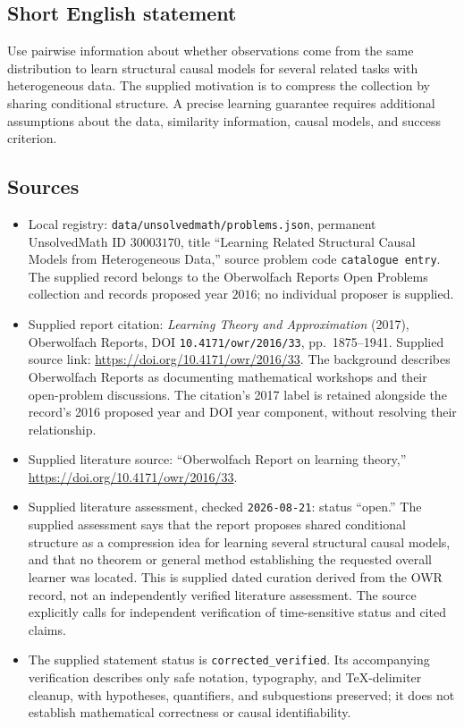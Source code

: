 \documentclass[11pt]{article}
\begin{document}
\subsection{Short English statement}
Use pairwise information about whether observations come from the same distribution to learn structural causal models for several related tasks with heterogeneous data. The supplied motivation is to compress the collection by sharing conditional structure. A precise learning guarantee requires additional assumptions about the data, similarity information, causal models, and success criterion.
\subsection{Sources}
\begin{itemize}
\item Local registry: \texttt{data/unsolvedmath/problems.json}, permanent UnsolvedMath ID \(30003170\), title ``Learning Related Structural Causal Models from Heterogeneous Data,'' source problem code \texttt{catalogue entry}. The supplied record belongs to the Oberwolfach Reports Open Problems collection and records proposed year \(2016\); no individual proposer is supplied.
\item Supplied report citation: \emph{Learning Theory and Approximation} (2017), Oberwolfach Reports, DOI \texttt{10.4171/owr/2016/33}, pp.\ 1875--1941. Supplied source link: \url{https://doi.org/10.4171/owr/2016/33}. The background describes Oberwolfach Reports as documenting mathematical workshops and their open-problem discussions. The citation's 2017 label is retained alongside the record's 2016 proposed year and DOI year component, without resolving their relationship.
\item Supplied literature source: ``Oberwolfach Report on learning theory,'' \url{https://doi.org/10.4171/owr/2016/33}.
\item Supplied literature assessment, checked \texttt{2026-08-21}: status ``open.'' The supplied assessment says that the report proposes shared conditional structure as a compression idea for learning several structural causal models, and that no theorem or general method establishing the requested overall learner was located. This is supplied dated curation derived from the OWR record, not an independently verified literature assessment. The source explicitly calls for independent verification of time-sensitive status and cited claims.
\item The supplied statement status is \texttt{corrected\_verified}. Its accompanying verification describes only safe notation, typography, and TeX-delimiter cleanup, with hypotheses, quantifiers, and subquestions preserved; it does not establish mathematical correctness or causal identifiability.
\end{itemize}
\end{document}
